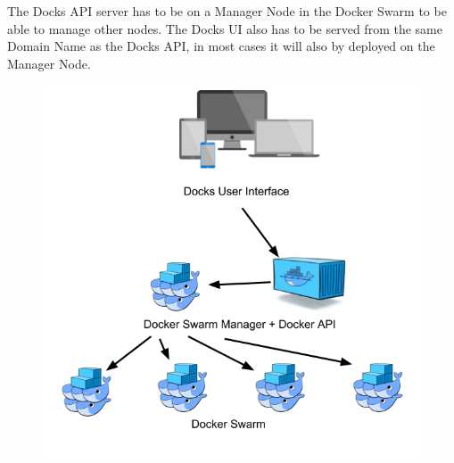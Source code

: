 \documentclass[]{article}
\begin{document}
The Docks API server has to be on a Manager Node in the Docker Swarm to be able to manage other nodes. The Docks UI also has to be served from the same Domain Name as the Docks API, in most cases it will also by deployed on the Manager Node.

\begin{figure}[h!]
	\centering
	\includegraphics[scale=0.5]{pretty_docks.png}
\end{figure}

\pagebreak
\end{document}
